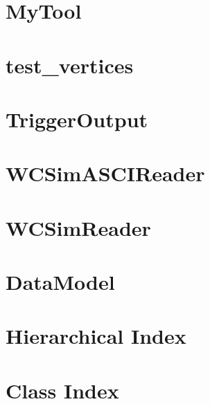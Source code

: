 \documentclass[twoside]{book}
\begin{document}
\chapter{My\-Tool}
\label{md_UserTools_template_README}
\hypertarget{md_UserTools_template_README}{}

\chapter{test\-\_\-vertices}
\label{md_UserTools_test_vertices_README}
\hypertarget{md_UserTools_test_vertices_README}{}

\chapter{Trigger\-Output}
\label{md_UserTools_TriggerOutput_README}
\hypertarget{md_UserTools_TriggerOutput_README}{}

\chapter{W\-C\-Sim\-A\-S\-C\-I\-Reader}
\label{md_UserTools_WCSimASCIReader_README}
\hypertarget{md_UserTools_WCSimASCIReader_README}{}

\chapter{W\-C\-Sim\-Reader}
\label{md_UserTools_WCSimReader_README}
\hypertarget{md_UserTools_WCSimReader_README}{}

\chapter{Data\-Model}
\label{md_DataModel_README}
\hypertarget{md_DataModel_README}{}

\chapter{Hierarchical Index}

\chapter{Class Index}

\end{document}
